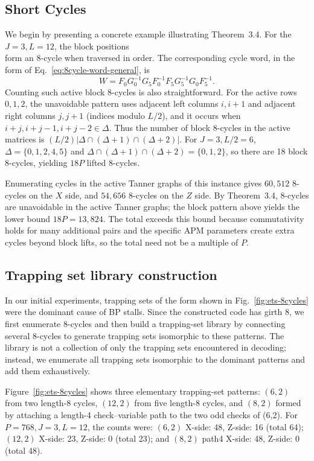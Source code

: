 \documentclass[a4paper,onecolumn,11pt,accepted=2026-08-03]{quantumarticle}
\renewcommand\[{\begin{equation}}
\renewcommand\]{\end{equation}}
\theoremstyle{definition}
\begin{document}
\subsection{Short Cycles}
We begin by presenting a concrete example illustrating Theorem~3.4.
For the $J=3,L=12$, the block positions
\[
 [(0,0),(0,6),(1,6),(1,1),(2,1),(2,7),(1,7),(1,0)]
\label{eq:8cycle-example}
\]
form an 8-cycle when traversed in order. The corresponding cycle word, in the form of Eq.~\eqref{eq:8cycle-word-general}, is
\begin{equation*}
W=F_0G_0^{-1}G_5F_0^{-1}F_5G_5^{-1}G_0F_5^{-1}.
\end{equation*}
Counting such active block 8-cycles is also straightforward. For the active rows $0,1,2$, the unavoidable pattern uses adjacent left columns $i,i+1$ and adjacent right columns $j,j+1$ (indices modulo $L/2$), and it occurs when $i+j,i+j-1,i+j-2\in\Delta$. Thus the number of block 8-cycles in the active matrices is $(L/2)|\Delta\cap(\Delta+1)\cap(\Delta+2)|$. For $J=3,L/2=6$, $\Delta=\{0,1,2,4,5\}$ and $\Delta\cap(\Delta+1)\cap(\Delta+2)=\{0,1,2\}$, so there are 18 block 8-cycles, yielding $18P$ lifted 8-cycles.

Enumerating cycles in the active Tanner graphs of this instance gives $60{,}512$ 8-cycles on the $X$ side, and $54{,}656$ 8-cycles on the $Z$ side. By Theorem~3.4, 8-cycles are unavoidable in the active Tanner graphs; the block pattern above yields the lower bound $18P=13{,}824$. The total exceeds this bound because commutativity holds for many additional pairs and the specific APM parameters create extra cycles beyond block lifts, so the total need not be a multiple of $P$.


\subsection{Trapping set library construction}
\label{sec:ets-library}
In our initial experiments, trapping sets of the form shown in Fig.~\ref{fig:ets-8cycles} were the dominant cause of BP stalls. Since the constructed code has girth 8, we first enumerate 8-cycles and then build a trapping-set library by connecting several 8-cycles to generate trapping sets isomorphic to these patterns. The library is not a collection of only the trapping sets encountered in decoding; instead, we enumerate all trapping sets isomorphic to the dominant patterns and add them exhaustively.

Figure~\ref{fig:ets-8cycles} shows three elementary trapping-set patterns: $(6,2)$ from two length-8 cycles, $(12,2)$ from five length-8 cycles, and $(8,2)$ formed by attaching a length-4 check--variable path to the two odd checks of (6,2). For $P=768,J=3,L=12$, the counts were: $(6,2)$ X-side: 48, Z-side: 16 (total 64); $(12,2)$ X-side: 23, Z-side: 0 (total 23); and $(8,2)$ path4 X-side: 48, Z-side: 0 (total 48).
\end{document}
